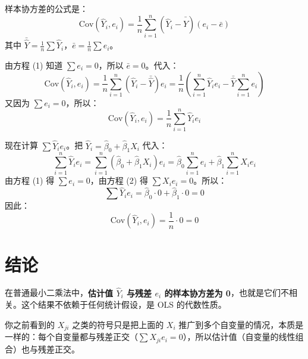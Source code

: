 \documentclass[12pt]{article}
\begin{document}
样本协方差的公式是：
\[
\mathrm{Cov}(\hat{Y}_i, e_i) = \frac{1}{n} \sum_{i=1}^n (\hat{Y}_i - \bar{\hat{Y}})(e_i - \bar{e})
\]
其中 \(\bar{\hat{Y}} = \frac{1}{n}\sum \hat{Y}_i\)，\(\bar{e} = \frac{1}{n}\sum e_i\)。

由方程 (1) 知道 \(\sum e_i = 0\)，所以 \(\bar{e} = 0\)。代入：
\[
\mathrm{Cov}(\hat{Y}_i, e_i) = \frac{1}{n} \sum_{i=1}^n (\hat{Y}_i - \bar{\hat{Y}}) e_i = \frac{1}{n} \left( \sum_{i=1}^n \hat{Y}_i e_i - \bar{\hat{Y}} \sum_{i=1}^n e_i \right)
\]
又因为 \(\sum e_i = 0\)，所以：
\[
\mathrm{Cov}(\hat{Y}_i, e_i) = \frac{1}{n} \sum_{i=1}^n \hat{Y}_i e_i
\]

现在计算 \(\sum \hat{Y}_i e_i\)。把 \(\hat{Y}_i = \hat{\beta}_0 + \hat{\beta}_1 X_i\) 代入：
\[
\sum_{i=1}^n \hat{Y}_i e_i = \sum_{i=1}^n (\hat{\beta}_0 + \hat{\beta}_1 X_i) e_i = \hat{\beta}_0 \sum_{i=1}^n e_i + \hat{\beta}_1 \sum_{i=1}^n X_i e_i
\]
由方程 (1) 得 \(\sum e_i = 0\)，由方程 (2) 得 \(\sum X_i e_i = 0\)。所以：
\[
\sum \hat{Y}_i e_i = \hat{\beta}_0 \cdot 0 + \hat{\beta}_1 \cdot 0 = 0
\]
因此：
\[
\mathrm{Cov}(\hat{Y}_i, e_i) = \frac{1}{n} \cdot 0 = 0
\]

\section{结论}

在普通最小二乘法中，\textbf{估计值 \(\hat{Y}_i\) 与残差 \(e_i\) 的样本协方差为 0}，也就是它们不相关。这个结果不依赖于任何统计假设，是 OLS 的代数性质。

你之前看到的 \(X_{ji}\) 之类的符号只是把上面的 \(X_i\) 推广到多个自变量的情况，本质是一样的：每个自变量都与残差正交（\(\sum X_{ji} e_i = 0\)），所以估计值（自变量的线性组合）也与残差正交。
\end{document}
